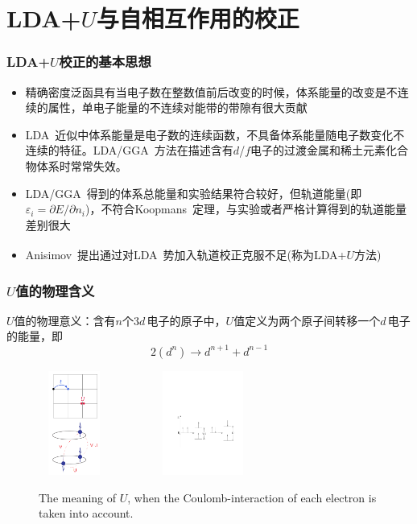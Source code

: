 \documentclass[cjk,slidestop,compress,mathserif,blue]{beamer}
\newcommand{\upcite}[1]{\hspace{0ex}\textsuperscript{\cite{#1}}} %
\begin{document}
\section{LDA+$U$与自相互作用的校正}
\frame
{
	\frametitle{\textrm{LDA}+$U$校正的基本思想}
\begin{itemize}
\setlength{\itemsep}{10pt}
	\item 精确密度泛函具有当电子数在整数值前后改变的时候，体系能量的改变是不连续的属性，单电子能量的不连续对能带的带隙有很大贡献
	 \item\textrm{LDA~}近似中体系能量是电子数的连续函数，不具备体系能量随电子数变化不连续的特征。\textrm{LDA/GGA~}方法在描述含有$d$/$f$电子的过渡金属和稀土元素化合物体系时常常失效。
	\item \textrm{LDA}/\textrm{GGA~}得到的体系总能量和实验结果符合较好，但轨道能量(即$\varepsilon_i=\partial E/\partial n_i$)，不符合\textrm{Koopmans~}定理，与实验或者严格计算得到的轨道能量差别很大%
	\item \textrm{Anisimov~}提出通过对\textrm{LDA~}势加入轨道校正克服不足(称为\textrm{LDA+$U$}方法)\upcite{PRB44-943_1991,PRB48-16929_1993}%
\end{itemize}
}
\frame
{
\frametitle{$U$值的物理含义}
\textrm{$U$}值的物理意义：含有$n$个3$d$\,电子的原子中，\textrm{$U$}值定义为两个原子间转移一个$d$\,电子的能量，即$$2(d^n)\rightarrow d^{n+1}+d^{n-1}$$
\begin{figure}[h!]
\centering
\includegraphics[height=1.35in,width=0.92in,viewport=1 1 240 375,clip]{Figures/LDA_U-1.png}
\includegraphics[height=1.35in,width=2.32in,viewport=110 210 545 455,clip]{Figures/LDA_U.pdf}
\caption{\small \textrm{The meaning of $U$, when the Coulomb-interaction of each electron is taken into account.}}%
\label{Tetrahedron_weight}
\end{figure}
}
\end{document}
